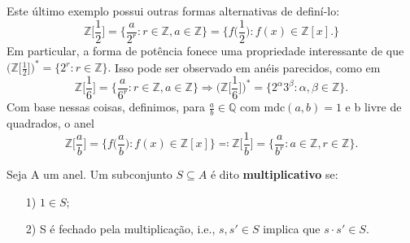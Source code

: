\documentclass[algebraII_notes.tex]{subfiles}
\begin{document}
Este último exemplo possui outras formas alternativas de definí-lo:
\[
	\mathbb{Z}\biggl[\frac{1}{2}\biggr] = \biggl\{\frac{a}{2^{r}}: r\in \mathbb{Z}, a\in \mathbb{Z}\biggr\} = \biggl\{f \biggl(\frac{1}{2}\biggr): f(x)\in \mathbb{Z}[x].\biggr\}
\]
Em particular, a forma de potência fonece uma propriedade interessante de que \(\biggl(\mathbb{Z}\biggl[\frac{1}{2}\biggr]\biggr)^{*} = \{2^{r}: r\in \mathbb{Z}\}.\) Isso pode ser observado
em anéis parecidos, como em
\[
	\mathbb{Z}\biggl[\frac{1}{6}\biggr] = \biggl\{\frac{a}{6^{r}}: r\in \mathbb{Z}, a\in \mathbb{Z}\biggr\} \Rightarrow \biggl(\mathbb{Z}\biggl[\frac{1}{6}\biggr]\biggr)^{*}=\{2^{\alpha }3^{\beta }:\alpha , \beta \in \mathbb{Z}\}.
\]
Com base nessas coisas, definimos, para \(\frac{a}{b}\in \mathbb{Q}\) com \(\mathrm{mdc}(a, b) = 1\) e b livre de quadrados, o anel
\[
	\mathbb{Z}\biggl[\frac{a}{b}\biggr] = \biggl\{f \biggl(\frac{a}{b}\biggr): f(x)\in \mathbb{Z}[x]\biggr\} \eqqcolon \mathbb{Z}\biggl[\frac{1}{b}\biggr] = \biggl\{\frac{a}{b^{r}}: a\in \mathbb{Z}, r\in \mathbb{Z}\biggr\}.
\]
\begin{def*}
	Seja A um anel. Um subconjunto \(S\subseteq A\) é dito \textbf{multiplicativo} se:
	\begin{itemize}
		\item[1)] \(1\in S;\)
		\item[2)] S é fechado pela multiplicação, i.e., \(s, s'\in S\) implica que \(s \cdot s'\in S.\)
	\end{itemize}
\end{def*}
\end{document}
